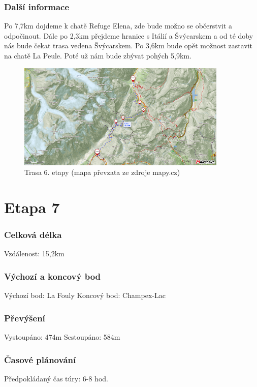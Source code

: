 \subsubsection*{Další informace}
Po 7,7\:km dojdeme k chatě Refuge Elena, zde bude možno se občerstvit a odpočinout. Dále po 2,3\:km přejdeme hranice s Itálií a Švýcarskem a od té doby nás bude čekat trasa vedena Švýcarskem. Po 3,6\:km bude opět možnost zastavit na chatě La Peule. Poté už nám bude zbývat pohých 5,9\:km.
\begin{figure}[!hbt]
    \centering
    \includegraphics[width=10.0cm]{Figures/day_6.png}
    \caption[Trasa: den šestý]{Trasa 6. etapy (mapa převzata ze zdroje mapy.cz)}
    \label{Obr:day_6}
\end{figure} 
\section{Etapa 7}
\subsubsection*{Celková délka}
\noindent Vzdálenost: 15,2\:km
\subsubsection*{Výchozí a koncový bod}
\noindent Výchozí bod: La Fouly
\noindent Koncový bod: Champex-Lac
\subsubsection*{Převýšení}
\noindent Vystoupáno: 474\:m
\noindent Sestoupáno: 584\:m
\subsubsection*{Časové plánování}
\noindent Předpokládaný čas túry: 6-8 hod.

